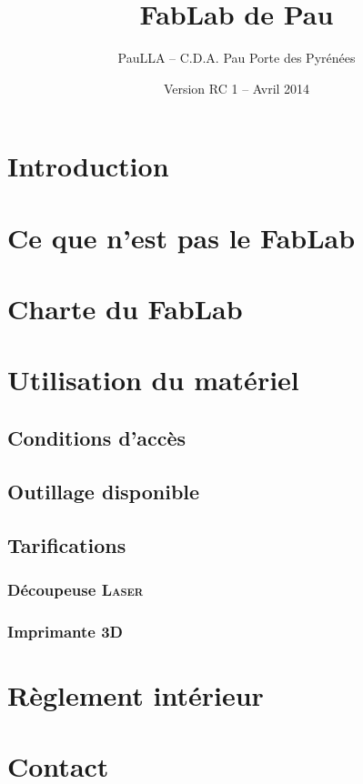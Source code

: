 \documentclass[a5paper,11pt]{article}
\title{FabLab de Pau} %
\author{PauLLA -- C.D.A. Pau Porte des Pyrénées}
\date{\vfill Version RC 1 -- Avril 2014}
\begin{document}
\maketitle\thispagestyle{empty}
\pagebreak
\tableofcontents\thispagestyle{empty}

\pagebreak\section{Introduction}

\pagebreak\section{Ce que n'est pas le FabLab}
\pagebreak\section{Charte du FabLab}

\pagebreak\section{Utilisation du matériel}
\subsection{Conditions d'accès}
\subsection{Outillage disponible}
\subsection{Tarifications}
\subsubsection{Découpeuse \textsc{Laser}}
\subsubsection{Imprimante 3D}
\pagebreak\section{Règlement intérieur}

\pagebreak\section{Contact}

\end{document}
